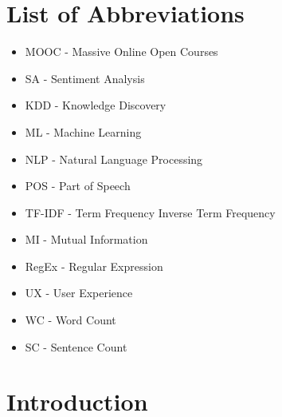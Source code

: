 \documentclass[
	a4paper,
	pdftex,
	12pt,	
	footinclude=true,
	fleqn,
	final,
	]{report}%
\begin{document}
\chapter*{List of Abbreviations}
\vspace{-0.6cm}
\begin{itemize}
 \item MOOC - Massive Online Open Courses
 \item SA - Sentiment Analysis
 \item KDD - Knowledge Discovery
  \item ML - Machine Learning
 \item NLP - Natural Language Processing
 \item POS - Part of Speech
 \item TF-IDF - Term Frequency Inverse Term Frequency
 \item MI - Mutual Information
 \item RegEx - Regular Expression
 \item UX - User Experience
 \item WC - Word Count
 \item SC - Sentence Count
\end{itemize}
\singlespacing

\newpage
\chapter{Introduction}
\label{ch:intro}
\vspace{-0.6cm}
\end{document}
